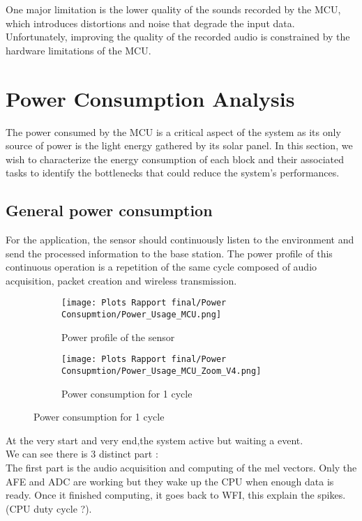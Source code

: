 \documentclass{article}
\begin{document}
One major limitation is the lower quality of the sounds recorded by the MCU, which introduces distortions and noise that degrade the input data. Unfortunately, improving the quality of the recorded audio is constrained by the hardware limitations of the MCU. 

\newpage
\section{Power Consumption Analysis}

The power consumed by the MCU is a critical aspect of the system as its only source of power is the light energy gathered by its solar panel. In this section, we wish to characterize the energy consumption of each block and their associated tasks to identify the bottlenecks that could reduce the system's performances.

\subsection{General power consumption}

For the application, the sensor should continuously listen to the environment and send the processed information to the base station. The power profile of this continuous operation is a repetition of the same cycle composed of audio acquisition, packet creation and wireless transmission.

\begin{figure}[h]
    \centering
    \begin{subfigure}{0.49\linewidth}
        \centering
        \texttt{[image: Plots Rapport final/Power Consupmtion/Power\_Usage\_MCU.png]}
        \caption{Power profile of the sensor}
    \end{subfigure}
    \hfill
    \begin{subfigure}{0.49\linewidth}
        \centering
        \texttt{[image: Plots Rapport final/Power Consupmtion/Power\_Usage\_MCU\_Zoom\_V4.png]}
        \caption{Power consumption for 1 cycle}
    \end{subfigure}
\end{figure}


At the very start and very end,the system active but waiting a event.\\
We can see there is 3 distinct part :\\
The first part is the audio acquisition and computing of the mel vectors. Only the AFE and ADC are working but they wake up the CPU when enough data is ready. Once it finished computing, it goes back to WFI, this explain the spikes. (CPU duty cycle ?).\\
\end{document}
